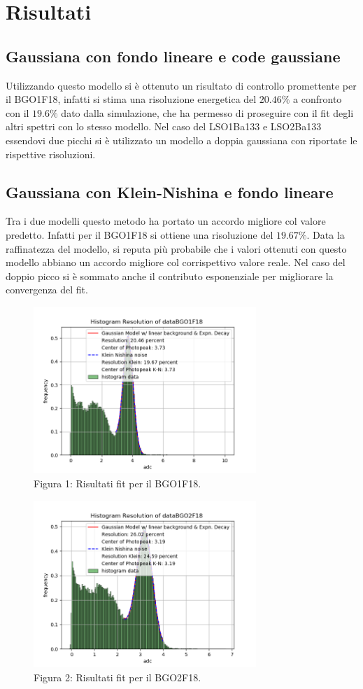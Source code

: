 \documentclass[a4paper]{article}
\begin{document}
\section{Risultati}
\subsection{Gaussiana con fondo lineare e code gaussiane}
Utilizzando questo modello si è ottenuto un risultato di controllo promettente per il BGO1F18, infatti si stima una risoluzione energetica del $20.46\%$ a confronto con il $19.6\%$ dato dalla simulazione, che ha permesso di proseguire con il fit degli altri spettri con lo stesso modello. Nel caso del LSO1Ba133 e LSO2Ba133 essendovi due picchi si è utilizzato un modello a doppia gaussiana con riportate le rispettive risoluzioni.
\subsection{Gaussiana con Klein-Nishina e fondo lineare}
Tra i due modelli questo metodo ha portato un accordo migliore col valore predetto. Infatti per il BGO1F18 si ottiene una risoluzione del $19.67\%$. Data la raffinatezza del modello, si reputa più probabile che i valori ottenuti con questo modello abbiano un accordo migliore col corrispettivo valore reale. Nel caso del doppio picco si è sommato anche il contributo esponenziale per migliorare la convergenza del fit.
\begin{figure}[H]
\centering
\includegraphics[width=0.75\textwidth]{histkleindataBGO1F18}
\caption{Figura 1: Risultati fit per il BGO1F18.}
\end{figure}
\begin{figure}[H]
\centering
\includegraphics[width=0.75\textwidth]{histkleindataBGO2F18}
\caption{Figura 2: Risultati fit per il BGO2F18.}
\end{figure}
\end{document}
